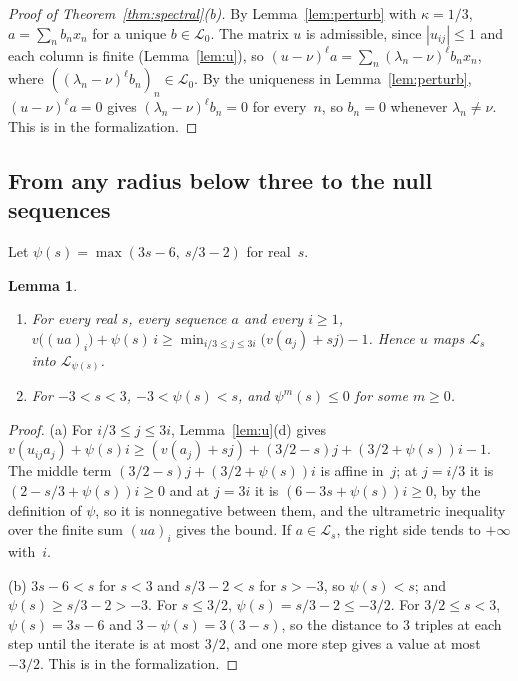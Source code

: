 \documentclass[11pt]{amsart}
\newtheorem{lemma}[theorem]{Lemma}
\theoremstyle{definition}
\numberwithin{equation}{section}
\newcommand{\lean}[1]{\ignorespaces}
\newcommand{\cL}{\mathcal{L}}
\newcommand{\Lc}{\mathcal{L}_0}
\begin{document}
\begin{proof}[Proof of Theorem~\textup{\ref{thm:spectral}(b)}]
By Lemma~\ref{lem:perturb} with $\kappa=1/3$, $a=\sum_nb_nx_n$ for a unique $b\in\Lc$. The matrix $u$ is admissible, since $|u_{ij}|\le1$ and each column is finite (Lemma~\ref{lem:u}), so $(u-\nu)^\ell a=\sum_n(\lambda_n-\nu)^\ell b_nx_n$, where $((\lambda_n-\nu)^\ell b_n)_n\in\Lc$. By the uniqueness in Lemma~\ref{lem:perturb}, $(u-\nu)^\ell a=0$ gives $(\lambda_n-\nu)^\ell b_n=0$ for every~$n$, so $b_n=0$ whenever $\lambda_n\ne\nu$. This is  in the formalization.
\end{proof}

\subsection{From any radius below three to the null sequences}
Let $\psi(s)=\max(3s-6,\ s/3-2)$ for real~$s$.

\begin{lemma}\label{lem:radius}\lean{CalegariSlopes.Spectral.exists_iterate_phiS_nonpos, CalegariSlopes.Spectral.InS_Uop, CalegariSlopes.Spectral.phiS_lt, CalegariSlopes.Spectral.phiS_gt}
\begin{enumerate}
\item[(a)] For every real $s$, every sequence $a$ and every $i\ge1$, $v\bigl((ua)_i\bigr)+\psi(s)\,i\ge\min_{i/3\le j\le3i}\bigl(v(a_j)+sj\bigr)-1$. Hence $u$ maps $\cL_s$ into $\cL_{\psi(s)}$.
\item[(b)] For $-3<s<3$, $-3<\psi(s)<s$, and $\psi^m(s)\le0$ for some $m\ge0$.
\end{enumerate}
\end{lemma}

\begin{proof}
(a) For $i/3\le j\le3i$, Lemma~\ref{lem:u}(d) gives $v(u_{ij}a_j)+\psi(s)i\ge(v(a_j)+sj)+(3/2-s)j+(3/2+\psi(s))i-1$. The middle term $(3/2-s)j+(3/2+\psi(s))i$ is affine in~$j$; at $j=i/3$ it is $(2-s/3+\psi(s))i\ge0$ and at $j=3i$ it is $(6-3s+\psi(s))i\ge0$, by the definition of $\psi$, so it is nonnegative between them, and the ultrametric inequality over the finite sum $(ua)_i$ gives the bound. If $a\in\cL_s$, the right side tends to $+\infty$ with~$i$.

(b) $3s-6<s$ for $s<3$ and $s/3-2<s$ for $s>-3$, so $\psi(s)<s$; and $\psi(s)\ge s/3-2>-3$. For $s\le3/2$, $\psi(s)=s/3-2\le-3/2$. For $3/2\le s<3$, $\psi(s)=3s-6$ and $3-\psi(s)=3(3-s)$, so the distance to $3$ triples at each step until the iterate is at most $3/2$, and one more step gives a value at most $-3/2$. This is  in the formalization.
\end{proof}
\end{document}
